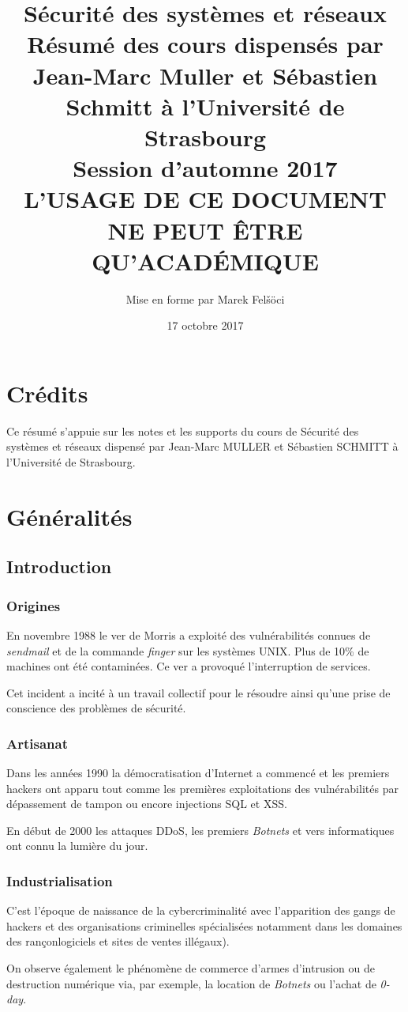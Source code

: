 \documentclass[12pt, a4paper]{article}
\title{
  \textbf{Sécurité des systèmes et réseaux} \\
  \Large Résumé des cours dispensés par Jean-Marc Muller et Sébastien Schmitt à
	l'Université de Strasbourg \\
  \large Session d'automne 2017 \\
  \huge L'USAGE DE CE DOCUMENT NE PEUT ÊTRE QU'ACADÉMIQUE
}
\author{Mise en forme par Marek Felšöci}
\date{17 octobre 2017}
\begin{document}
	\maketitle
	\section*{Crédits}
  Ce résumé s'appuie sur les notes et les supports du cours de Sécurité des
	systèmes et réseaux dispensé par Jean-Marc MULLER et Sébastien SCHMITT à
	l'Université de	Strasbourg.
	\section{Généralités}
	\subsection{Introduction}
	\subsubsection{Origines}
	En novembre 1988 le ver de Morris a exploité des vulnérabilités connues de
	\textit{sendmail} et de la commande \textit{finger} sur les systèmes UNIX.
	Plus de 10\% de machines ont été contaminées. Ce ver a provoqué l'interruption
	 de services.
	\par
	Cet incident a incité à un travail collectif pour le résoudre ainsi qu'une
	prise de conscience des problèmes de sécurité.
	\subsubsection{Artisanat}
	Dans les années 1990 la démocratisation d'Internet a commencé et les premiers
	hackers ont apparu tout comme les premières exploitations des vulnérabilités
	par dépassement de tampon ou encore injections SQL et XSS.
	\par
	En début de 2000 les attaques DDoS, les premiers \textit{Botnets} et vers
	informatiques ont connu la lumière du jour.
	\subsubsection{Industrialisation}
	C'est l'époque de naissance de la cybercriminalité avec l'apparition des gangs
	 de hackers et des organisations criminelles spécialisées notamment dans les
	domaines des rançonlogiciels et sites de ventes illégaux).
	\par
	On observe également le phénomène de commerce d'armes d'intrusion ou de
	destruction numérique via, par exemple, la location de \textit{Botnets} ou
	l'achat de \textit{0-day}.
\end{document}
